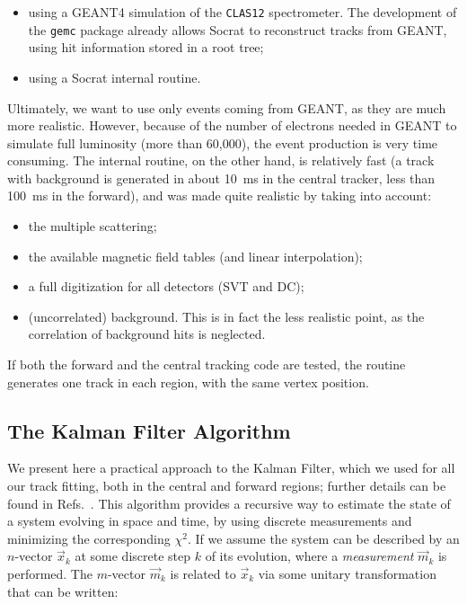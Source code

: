 \begin{itemize}
\item using a GEANT4 simulation of the {\tt CLAS12} spectrometer.  The development 
of the {\tt gemc} package already allows Socrat to reconstruct tracks from GEANT, 
using hit information stored in a root tree;
\item using a Socrat internal routine.
\end{itemize}

Ultimately, we want to use only events coming from GEANT, as they are much more 
realistic.  However, because of the number of electrons needed in GEANT to 
simulate full luminosity (more than 60,000), the event production is very time 
consuming.  The internal routine, on the other hand, is relatively fast (a track 
with background is generated in about 10~ms in the central tracker, less than 100~ms 
in the forward), and was made quite realistic by taking into account:

\begin{itemize}
\item the multiple scattering;
\item the available magnetic field tables (and linear interpolation);
\item a full digitization for all detectors (SVT and DC);
\item (uncorrelated) background. This is in fact the less realistic point, as the 
correlation of background hits is neglected.
\end{itemize}

\noindent
If both the forward and the central tracking code are tested, the routine generates 
one track in each region, with the same vertex position.

\subsection{The Kalman Filter Algorithm}
\label{sec_KF}

We present here a practical approach to the Kalman Filter, which we used for all 
our track fitting, both in the central and forward regions; further details can 
be found in Refs.~\cite{Fruhwirth,Welch}.  This algorithm provides a recursive way 
to estimate the state of a system evolving in space and time, by using discrete 
measurements and minimizing the corresponding $\chi^2$.  If we assume the system can 
be described by an $n$-vector $\vec{x}_k$ at some discrete step $k$ of its evolution, 
where a \emph{measurement} $\vec{m}_k$ is performed.  The $m$-vector $\vec{m}_k$ is 
related to $\vec{x}_k$ via some unitary transformation that can be written:

